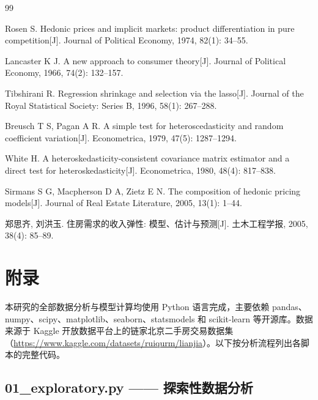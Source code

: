 \documentclass[12pt,a4paper]{ctexart}
\begin{document}
\clearpage
\begin{thebibliography}{99}

Rosen S. Hedonic prices and implicit markets: product differentiation in pure competition[J].
Journal of Political Economy, 1974, 82(1): 34--55.

Lancaster K J. A new approach to consumer theory[J].
Journal of Political Economy, 1966, 74(2): 132--157.

Tibshirani R. Regression shrinkage and selection via the lasso[J].
Journal of the Royal Statistical Society: Series B, 1996, 58(1): 267--288.

Breusch T S, Pagan A R. A simple test for heteroscedasticity and random coefficient variation[J].
Econometrica, 1979, 47(5): 1287--1294.

White H. A heteroskedasticity-consistent covariance matrix estimator and a direct test for heteroskedasticity[J].
Econometrica, 1980, 48(4): 817--838.

Sirmans S G, Macpherson D A, Zietz E N. The composition of hedonic pricing models[J].
Journal of Real Estate Literature, 2005, 13(1): 1--44.

郑思齐, 刘洪玉. 住房需求的收入弹性: 模型、估计与预测[J].
土木工程学报, 2005, 38(4): 85--89.

\end{thebibliography}

\clearpage
{}
\section*{附录}

本研究的全部数据分析与模型计算均使用 Python 语言完成，主要依赖 pandas、numpy、scipy、matplotlib、seaborn、statsmodels 和 scikit-learn 等开源库。数据来源于 Kaggle 开放数据平台上的链家北京二手房交易数据集（\url{https://www.kaggle.com/datasets/ruiqurm/lianjia}）。以下按分析流程列出各脚本的完整代码。

\subsection*{01\_exploratory.py —— 探索性数据分析}

\end{document}
